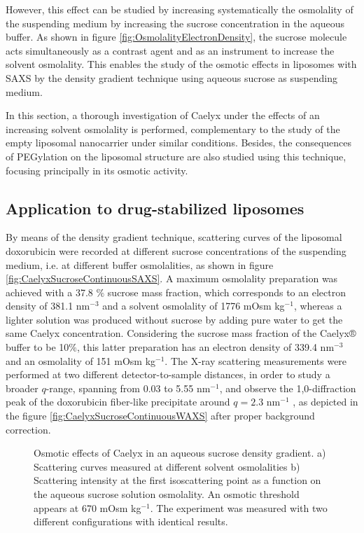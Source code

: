 However, this effect can be studied by increasing systematically the osmolality of the suspending medium by increasing the sucrose concentration in the aqueous buffer. As shown in figure \ref{fig:OsmolalityElectronDensity}, the sucrose molecule acts simultaneously as a contrast agent and as an instrument to increase the solvent osmolality. This enables the study of the osmotic effects in liposomes with SAXS by the density gradient technique using aqueous sucrose as suspending medium. 

In this section, a thorough investigation of Caelyx under the effects of an increasing solvent osmolality is performed, complementary to the study of the empty liposomal nanocarrier under similar conditions. Besides, the consequences of PEGylation on the liposomal structure are also studied using this technique, focusing principally in its osmotic activity. 


\subsection{Application to drug-stabilized liposomes}
\label{sec:OsmoticCaelyx}
By means of the density gradient technique, scattering curves of the liposomal doxorubicin were recorded at different sucrose concentrations of the suspending medium, i.e. at different buffer osmolalities, as shown in figure \ref{fig:CaelyxSucroseContinuousSAXS}. A maximum osmolality preparation was achieved with a 37.8 $\%$ sucrose mass fraction, which corresponds to an electron density of 381.1 nm$^{-3}$ and a solvent osmolality of 1776 mOsm kg$^{-1}$,  whereas a lighter solution was produced without sucrose by adding pure water to get the same Caelyx concentration. Considering the sucrose mass fraction of the Caelyx® buffer to be 10$\%$, this latter preparation has an electron density of 339.4 nm$^{-3}$ and an osmolality of 151 mOsm kg$^{-1}$. The X-ray scattering measurements were performed at two different detector-to-sample distances, in order to study a broader $q$-range, spanning from 0.03 to 5.55 nm$^{-1}$, and observe the 1,0-diffraction peak of the doxorubicin fiber-like precipitate around $q=2.3$ nm$^{-1}$ \citep{li_doxorubicin_1998}, as depicted in the figure \ref{fig:CaelyxSucroseContinuousWAXS} after proper background correction.

\begin{figure}
	\centering
		\caption[Osmotic effects of Caelyx in an aqueous sucrose density gradient.]{Osmotic effects of Caelyx in an aqueous sucrose density gradient. a) Scattering curves measured at different solvent osmolalities  b) Scattering intensity at the first isoscattering point as a function on the aqueous sucrose solution osmolality. An osmotic threshold appears at 670 mOsm kg$^{-1}$. The experiment was measured with two different configurations with identical results.}
\end{figure}

